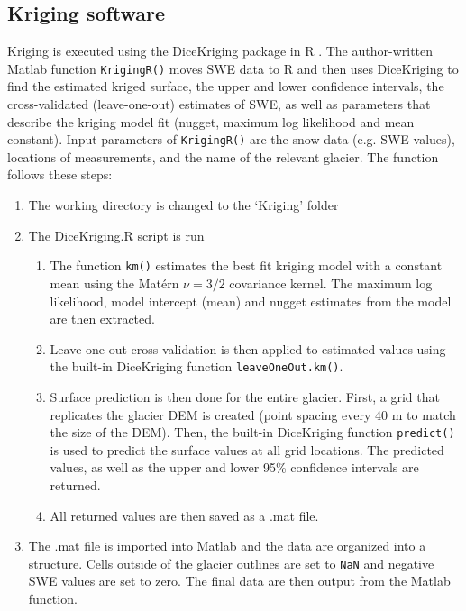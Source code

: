 \documentclass{sfuthesis}
\begin{document}
\begin{appendices}
\chapter{Kriging software}
\label{app:KrigingMethods}
Kriging is executed using the DiceKriging package in R \citep{Roustant2012}. The author-written Matlab function \texttt{KrigingR()} moves SWE data to R and then uses DiceKriging to find the estimated kriged surface, the upper and lower confidence intervals, the cross-validated (leave-one-out) estimates of SWE, as well as parameters that describe the kriging model fit (nugget, maximum log likelihood and mean constant). Input parameters of  \texttt{KrigingR()} are the snow data (e.g. SWE values), locations of measurements, and the name of the relevant glacier. The function follows these steps:
\begin{enumerate}
\item The working directory is changed to the `Kriging' folder
\item The DiceKriging.R script is run
	\begin{enumerate}
	\item The function \texttt{km()} estimates the best fit kriging model with a constant mean using the Mat\'ern $\nu = 3/2$ covariance kernel. The maximum log likelihood, model intercept (mean) and nugget estimates from the model are then extracted. 
	\item Leave-one-out cross validation is then applied to estimated values using the built-in DiceKriging function \texttt{leaveOneOut.km()}.
	\item Surface prediction is then done for the entire glacier. First, a grid that replicates the glacier DEM is created (point spacing every 40 m to match the size of the DEM). Then, the built-in DiceKriging function \texttt{predict()} is used to predict the surface values at all grid locations. The predicted values, as well as the upper and lower 95\% confidence intervals are returned. 
	\item All returned values are then saved as a .mat file.
	\end{enumerate}
\item The .mat file is imported into Matlab and the data are organized into a structure. Cells outside of the glacier outlines are set to \texttt{NaN} and negative SWE values are set to zero. The final data are then output from the Matlab function. 
\end{enumerate}


\end{appendices}
\end{document}
